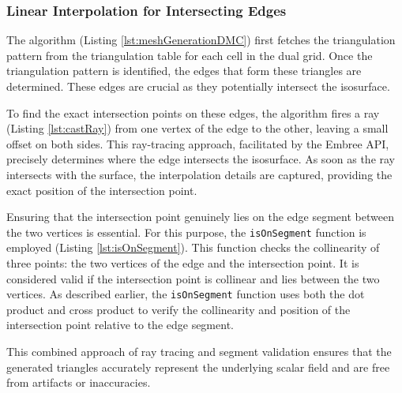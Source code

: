 \subsubsection{Linear Interpolation for Intersecting Edges}

The algorithm (Listing \ref{lst:meshGenerationDMC}) first fetches the triangulation pattern from the triangulation table for each cell in the dual grid. Once the triangulation pattern is identified, the edges that form these triangles are determined. These edges are crucial as they potentially intersect the isosurface.

To find the exact intersection points on these edges, the algorithm fires a ray (Listing \ref{lst:castRay}) from one vertex of the edge to the other, leaving a small offset on both sides. This ray-tracing approach, facilitated by the Embree API, precisely determines where the edge intersects the isosurface. As soon as the ray intersects with the surface, the interpolation details are captured, providing the exact position of the intersection point.

Ensuring that the intersection point genuinely lies on the edge segment between the two vertices is essential. For this purpose, the \texttt{isOnSegment} function is employed (Listing \ref{lst:isOnSegment}). This function checks the collinearity of three points: the two vertices of the edge and the intersection point. It is considered valid if the intersection point is collinear and lies between the two vertices. As described earlier, the \texttt{isOnSegment} function uses both the dot product and cross product to verify the collinearity and position of the intersection point relative to the edge segment.

This combined approach of ray tracing and segment validation ensures that the generated triangles accurately represent the underlying scalar field and are free from artifacts or inaccuracies.

